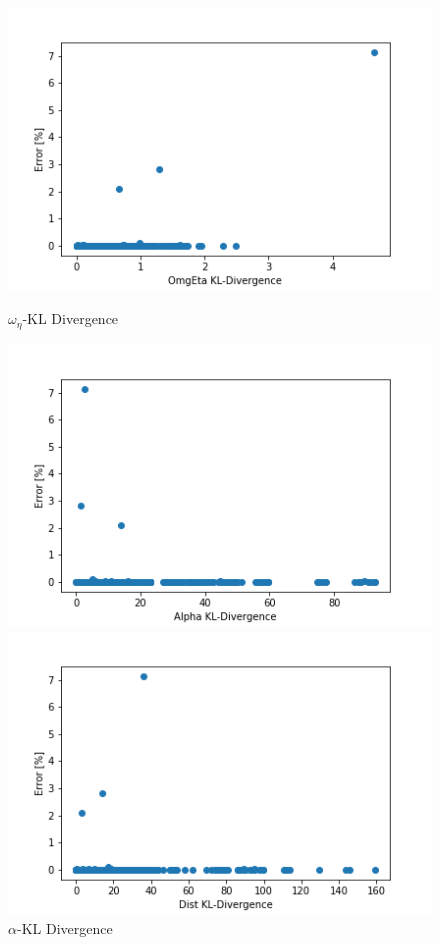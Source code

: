 \documentclass[16.7pt]{jsarticle}
\begin{document}
		\begin{figure}[h]
			\centering
			\begin{minipage}{0.45\hsize}
				\centering
				\includegraphics[width= 0.85\columnwidth]{./figure/OmgEta_Div.png}
				\caption{$ \omega_{\eta} $-KL Divergence}
			\end{minipage}
			\begin{minipage}{0.45\hsize}
				\centering
				\includegraphics[width= 0.85\columnwidth]{./figure/Alpha_Div.png}
				\caption{$ \alpha $-KL Divergence}
			\end{minipage}
				\begin{minipage}{0.45\hsize}
				\centering
				\includegraphics[width= 0.85\columnwidth]{./figure/Dist_Div.png}

\end{minipage}
\end{figure}
\end{document}
